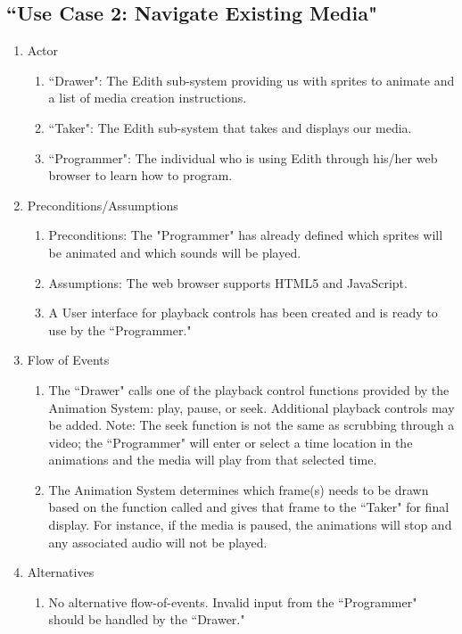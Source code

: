 \documentclass[12pt]{article}
\begin{document}
\begin{enumerate}
\begin{enumerate}
  \subsection{``Use Case 2: Navigate Existing Media"}
\begin{enumerate}
  \item Actor
  \begin{enumerate}
      \item ``Drawer": The Edith sub-system providing us with sprites to animate and a list of media creation instructions.
       \item ``Taker": The Edith sub-system that takes and displays our media.
       \item ``Programmer": The individual who is using Edith through his/her web browser to learn how to program.
  \end{enumerate}
  \item Preconditions/Assumptions
  \begin{enumerate}
       \item Preconditions: The "Programmer" has already defined which sprites will be animated and which sounds will be played.
       \item Assumptions: The web browser supports HTML5 and JavaScript.
       \item A User interface for playback controls has been created and is ready to use by the ``Programmer."
  \end{enumerate}
  \item Flow of Events
  \begin{enumerate}
      \item The ``Drawer" calls one of the playback control functions provided by the Animation System: play, pause, or seek. Additional playback controls may be added. Note: The seek function is not the same as scrubbing through a video; the ``Programmer" will enter or select a time location in the animations and the media will play from that selected time.
      \item The Animation System determines which frame(s) needs to be drawn based on the function called and gives that frame to the ``Taker" for final display. For instance, if the media is paused, the animations will stop and any associated audio will not be played.
  \end{enumerate}
  \item Alternatives
  \begin{enumerate}
        \item No alternative flow-of-events. Invalid input from the ``Programmer" should be handled by the ``Drawer."
  \end{enumerate}
\end{enumerate}
	

\end{enumerate}
\end{enumerate}
\end{document}
